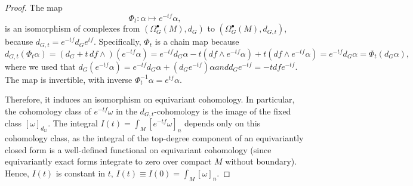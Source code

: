 \documentclass[10pt,a4paper]{amsart}
\begin{document}
\begin{proof}
The map
\begin{equation}
\Phi_t: \alpha \mapsto e^{-tf} \alpha,
\end{equation}
is an isomorphism of complexes from $(\Omega_G^\bullet(M), d_G)$ to $(\Omega_G^\bullet(M), d_{G,t})$, because $d_{G,t} = e^{-tf} d_G e^{tf}$. Specifically, $\Phi_t$ is a chain map because
\begin{equation}
d_{G,t} (\Phi_t \alpha) = (d_G + t \, df \wedge) (e^{-tf} \alpha) = e^{-tf} d_G \alpha - t (df \wedge e^{-tf} \alpha) + t (df \wedge e^{-tf} \alpha) = e^{-tf} d_G \alpha = \Phi_t (d_G \alpha),
\end{equation}
where we used that $d_G (e^{-tf} \alpha) = e^{-tf} d_G \alpha + (d_G e^{-tf}) \alpha and d_G e^{-tf} = -t df e^{-tf}$. The map is invertible, with inverse $\Phi_t^{-1} \alpha = e^{tf} \alpha$.

Therefore, it induces an isomorphism on equivariant cohomology. In particular, the cohomology class of $e^{-tf} \omega$ in the $d_{G,t}$-cohomology is the image of the fixed class $[\omega]_{d_G}$. The integral $I(t) = \int_M [e^{-tf} \omega]_n$ depends only on this cohomology class, as the integral of the top-degree component of an equivariantly closed form is a well-defined functional on equivariant cohomology (since equivariantly exact forms integrate to zero over compact $M$ without boundary). Hence, $I(t)$ is constant in $t$, $I(t) \equiv I(0) = \int_M [\omega]_n$.
\end{proof}
\end{document}
